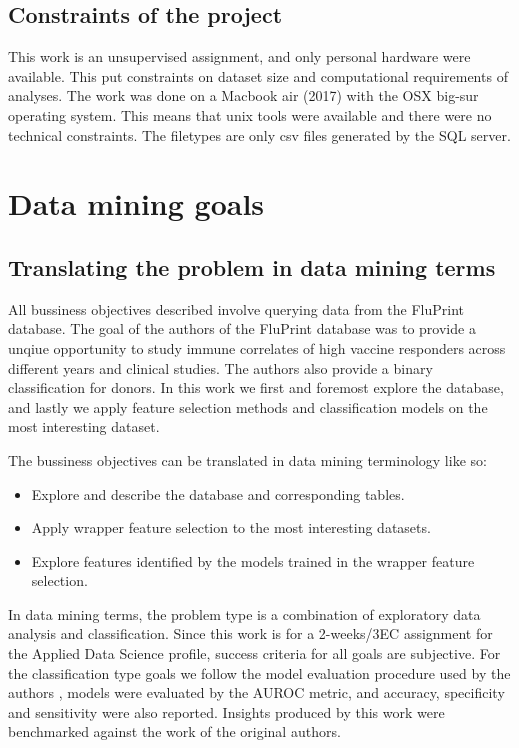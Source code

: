 \subsection{Constraints of the project}

This work is an unsupervised assignment, and only personal hardware were
available. This put constraints on dataset size and computational requirements
of analyses. The work was done on a Macbook air (2017) with the OSX big-sur
operating system. This means that unix tools were available and there were no
technical constraints. The filetypes are only csv files generated by the SQL
server.

\section{Data mining goals}

\subsection{Translating the problem in data mining terms}
All bussiness objectives described involve querying data from the FluPrint
database. The goal of the authors of the FluPrint database was to provide a
unqiue opportunity to study immune correlates of high vaccine responders across
different years and clinical studies. The authors also provide a binary
classification for donors. In this work we first and foremost explore the
database, and lastly we apply feature selection methods and classification
models on the most interesting dataset.

The bussiness objectives can be translated in data mining terminology like so:
\begin{itemize}
        \item Explore and describe the database and corresponding tables.
        \item Apply wrapper feature selection to the most interesting datasets.
        \item Explore features identified by the models trained in the wrapper feature selection.
\end{itemize}

In data mining terms, the problem type is a combination of exploratory data
analysis and classification. Since this work is for a 2-weeks/3EC assignment
for the Applied Data Science profile, success criteria for all goals are
subjective. For the classification type goals we follow
the model evaluation procedure used by the authors
\cite{tomicSIMONAutomatedMachine2019}, models were evaluated by the AUROC
metric, and accuracy, specificity and sensitivity were also reported. Insights
produced by this work were benchmarked against the work of the original
authors.

